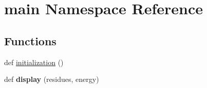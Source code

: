 \hypertarget{namespacemain}{}\section{main Namespace Reference}
\label{namespacemain}
\subsection*{Functions}
\begin{DoxyCompactItemize}
\item 
def \hyperlink{namespacemain_a36aaa6fc324305b9b0013cabac87a440}{initialization} ()
\item 
\mbox{\label{namespacemain_a51783205174f755b91f28ed9ab2fe195}} 
def {\bfseries display} (residues, energy)
\end{DoxyCompactItemize}
